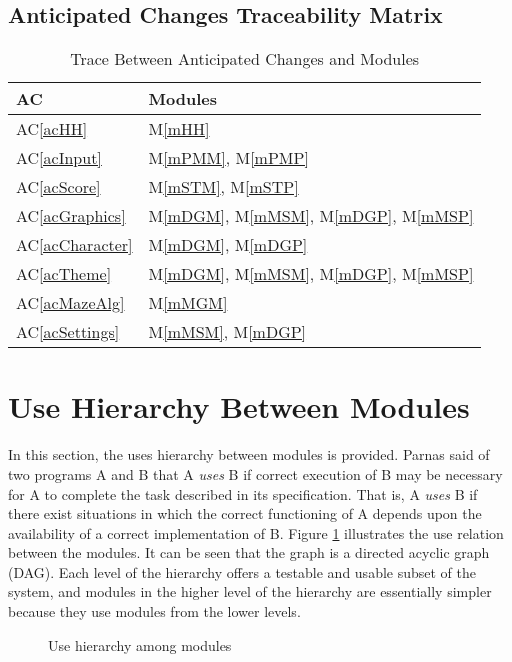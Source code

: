 \documentclass[12pt, titlepage]{article}
\newcommand{\acref}[1]{AC\ref{#1}}
\newcommand{\mref}[1]{M\ref{#1}}
\begin{document}
\subsection{Anticipated Changes Traceability Matrix}
\begin{table}[H]
\centering
\begin{tabular}{p{} p{}}
\toprule
\textbf{AC} & \textbf{Modules}\\
\midrule
\acref{acHH} & \mref{mHH}\\
\acref{acInput} & \mref{mPMM}, \mref{mPMP}\\
\acref{acScore} & \mref{mSTM}, \mref{mSTP}\\
\acref{acGraphics} & \mref{mDGM}, \mref{mMSM}, \mref{mDGP}, \mref{mMSP}\\
\acref{acCharacter} & \mref{mDGM}, \mref{mDGP}\\
\acref{acTheme} & \mref{mDGM}, \mref{mMSM}, \mref{mDGP}, \mref{mMSP}\\
\acref{acMazeAlg} & \mref{mMGM}\\
\acref{acSettings} & \mref{mMSM}, \mref{mDGP}\\
\bottomrule
\end{tabular}
\caption{Trace Between Anticipated Changes and Modules}
\label{TblACT}
\end{table}
\newpage

\section{Use Hierarchy Between Modules} \label{SecUse}

In this section, the uses hierarchy between modules is
provided. Parnas said of two programs A and B that A {\em uses} B if
correct execution of B may be necessary for A to complete the task described in
its specification. That is, A {\em uses} B if there exist situations in which
the correct functioning of A depends upon the availability of a correct
implementation of B.  Figure \ref{FigUH} illustrates the use relation between
the modules. It can be seen that the graph is a directed acyclic graph
(DAG). Each level of the hierarchy offers a testable and usable subset of the
system, and modules in the higher level of the hierarchy are essentially simpler
because they use modules from the lower levels.

\begin{figure}[H]
\centering
\caption{Use hierarchy among modules}
\label{FigUH}
\end{figure}
\end{document}
